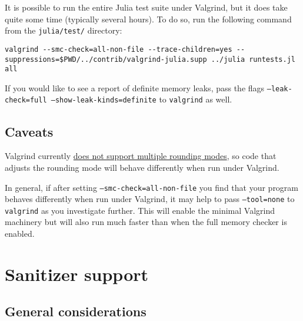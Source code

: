 It is possible to run the entire Julia test suite under Valgrind, but it does take quite some time (typically several hours).  To do so, run the following command from the \texttt{julia/test/} directory:




\begin{lstlisting}
valgrind --smc-check=all-non-file --trace-children=yes --suppressions=$PWD/../contrib/valgrind-julia.supp ../julia runtests.jl all
\end{lstlisting}



If you would like to see a report of {\textquotedbl}definite{\textquotedbl} memory leaks, pass the flags \texttt{--leak-check=full --show-leak-kinds=definite} to \texttt{valgrind} as well.



\hypertarget{11463604234155946056}{}


\subsection{Caveats}



Valgrind currently \href{https://bugs.kde.org/show\_bug.cgi?id=136779}{does not support multiple rounding modes}, so code that adjusts the rounding mode will behave differently when run under Valgrind.



In general, if after setting \texttt{--smc-check=all-non-file} you find that your program behaves differently when run under Valgrind, it may help to pass \texttt{--tool=none} to \texttt{valgrind} as you investigate further.  This will enable the minimal Valgrind machinery but will also run much faster than when the full memory checker is enabled.



\hypertarget{7868060637958278195}{}


\section{Sanitizer support}



\hypertarget{527857279218691176}{}


\subsection{General considerations}



